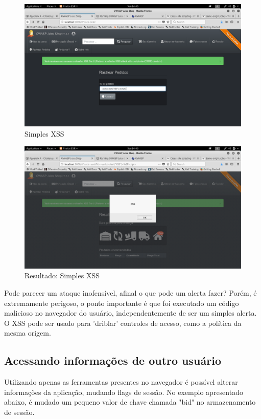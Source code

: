 \documentclass[journal]{IEEEtran}
\begin{document}
\begin{figure}[h!]
	\includegraphics[width=\linewidth]{../fotos/juice_shop/simple_XSS_1.png}
	\caption{Simples XSS}
	\label{fig:simple_xss_1}
\end{figure}

\begin{figure}[h!]
	\includegraphics[width=\linewidth]{../fotos/juice_shop/simple_XSS_2.png}
	\caption{Resultado: Simples XSS}
	\label{fig:simple_xss_2}
\end{figure}

Pode parecer um ataque inofensível, afinal o que pode um alerta fazer? Porém, é extremamente perigoso, o ponto importante é que foi executado um código malicioso no navegador do usuário, independentemente de ser um simples alerta. O XSS pode ser usado para 'driblar' controles de acesso, como a política da mesma origem.

\subsection{Acessando informações de outro usuário}
Utilizando apenas as ferramentas presentes no navegador é possível alterar informações da aplicação, mudando flags de sessão. No exemplo apresentado abaixo, é mudado um pequeno valor de chave chamada "bid" no armazenamento de sessão.
\end{document}
